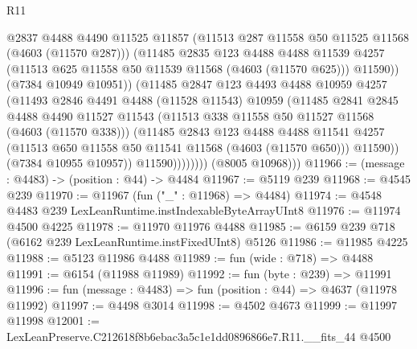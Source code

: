 \begin{lexlean}{R11}
\begin{coremodule}
                          @2837
                          @4488
                          @4490
                          @11525
                          @11857
                          (@11513 @287 @11558 @50 @11525 @11568 (@4603 (@11570 @287)))
                          (@11485
                            @2835
                            @123
                            @4488
                            @4488
                            @11539
                            @4257
                            (@11513 @625 @11558 @50 @11539 @11568 (@4603 (@11570 @625)))
                            @11590))
                        (@7384 @10949 @10951))
                      (@11485
                        @2847
                        @123
                        @4493
                        @4488
                        @10959
                        @4257
                        (@11493
                          @2846
                          @4491
                          @4488
                          (@11528 @11543)
                          @10959
                          (@11485
                            @2841
                            @2845
                            @4488
                            @4490
                            @11527
                            @11543
                            (@11513 @338 @11558 @50 @11527 @11568 (@4603 (@11570 @338)))
                            (@11485
                              @2843
                              @123
                              @4488
                              @4488
                              @11541
                              @4257
                              (@11513 @650 @11558 @50 @11541 @11568 (@4603 (@11570 @650)))
                              @11590))
                          (@7384 @10955 @10957))
                        @11590))))))))
        (@8005 @10968)))
@11966 := (message : @4483) -> (position : @44) -> @4484
@11967 := @5119 @239
@11968 := @4545 @239
@11970 := @11967 (fun ("_" : @11968) => @4484)
@11974 := @4548 @4483 @239 LexLeanRuntime.instIndexableByteArrayUInt8
@11976 := @11974 @4500 @4225
@11978 := @11970 @11976 @4488
@11985 := @6159 @239 @718 (@6162 @239 LexLeanRuntime.instFixedUInt8) @5126
@11986 := @11985 @4225
@11988 := @5123 @11986 @4488
@11989 := fun (wide : @718) => @4488
@11991 := @6154 (@11988 @11989)
@11992 := fun (byte : @239) => @11991
@11996 := fun (message : @4483) => fun (position : @44) => @4637 (@11978 @11992)
@11997 := @4498 @3014
@11998 := @4502 @4673
@11999 := @11997 @11998
@12001 := LexLeanPreserve.C212618f8b6ebac3a5c1e1dd0896866e7.R11.__fits_44 @4500

\end{coremodule}
\end{lexlean}
